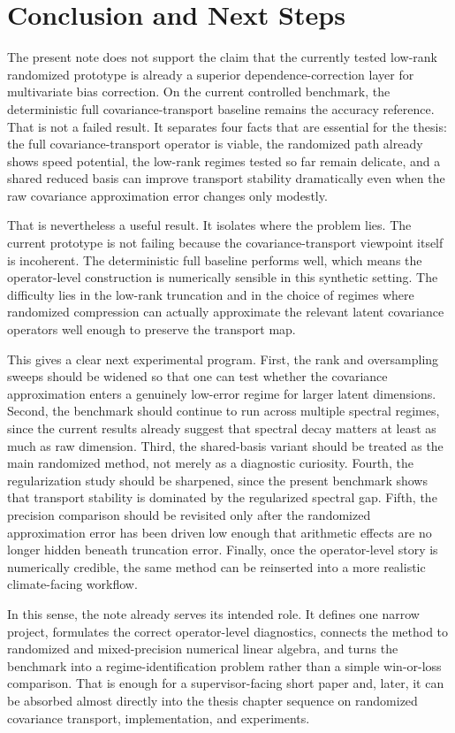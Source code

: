 \section{Conclusion and Next Steps}

The present note does not support the claim that the currently tested low-rank randomized prototype is already a superior dependence-correction layer for multivariate bias correction. On the current controlled benchmark, the deterministic full covariance-transport baseline remains the accuracy reference. That is not a failed result. It separates four facts that are essential for the thesis: the full covariance-transport operator is viable, the randomized path already shows speed potential, the low-rank regimes tested so far remain delicate, and a shared reduced basis can improve transport stability dramatically even when the raw covariance approximation error changes only modestly.

That is nevertheless a useful result. It isolates where the problem lies. The current prototype is not failing because the covariance-transport viewpoint itself is incoherent. The deterministic full baseline performs well, which means the operator-level construction is numerically sensible in this synthetic setting. The difficulty lies in the low-rank truncation and in the choice of regimes where randomized compression can actually approximate the relevant latent covariance operators well enough to preserve the transport map.

This gives a clear next experimental program. First, the rank and oversampling sweeps should be widened so that one can test whether the covariance approximation enters a genuinely low-error regime for larger latent dimensions. Second, the benchmark should continue to run across multiple spectral regimes, since the current results already suggest that spectral decay matters at least as much as raw dimension. Third, the shared-basis variant should be treated as the main randomized method, not merely as a diagnostic curiosity. Fourth, the regularization study should be sharpened, since the present benchmark shows that transport stability is dominated by the regularized spectral gap. Fifth, the precision comparison should be revisited only after the randomized approximation error has been driven low enough that arithmetic effects are no longer hidden beneath truncation error. Finally, once the operator-level story is numerically credible, the same method can be reinserted into a more realistic climate-facing workflow.

In this sense, the note already serves its intended role. It defines one narrow project, formulates the correct operator-level diagnostics, connects the method to randomized and mixed-precision numerical linear algebra, and turns the benchmark into a regime-identification problem rather than a simple win-or-loss comparison. That is enough for a supervisor-facing short paper and, later, it can be absorbed almost directly into the thesis chapter sequence on randomized covariance transport, implementation, and experiments.
